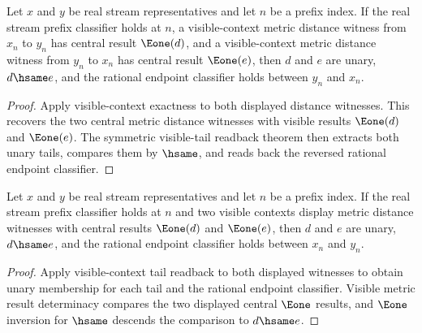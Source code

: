 \begin{theorem}
\label{thm:completion-visible-context-symmetric-tail-readback}
Let $x$ and $y$ be real stream representatives and let $n$ be a prefix
index. If the real stream prefix classifier holds at $n$, a visible-context
metric distance witness from $x_n$ to $y_n$ has central result $\Eone(d)$,
and a visible-context metric distance witness from $y_n$ to $x_n$ has central
result $\Eone(e)$, then $d$ and $e$ are unary, $d\hsame e$, and the rational
endpoint classifier holds between $y_n$ and $x_n$.
\end{theorem}
\begin{proof}
Apply visible-context exactness to both displayed distance witnesses. This
recovers the two central metric distance witnesses with visible results
$\Eone(d)$ and $\Eone(e)$. The symmetric visible-tail readback theorem then
extracts both unary tails, compares them by $\hsame$, and reads back the
reversed rational endpoint classifier.
\end{proof}

\begin{theorem}
\label{thm:completion-metric-distance-visible-context-e1-tail-deterministic}
Let $x$ and $y$ be real stream representatives and let $n$ be a prefix
index. If the real stream prefix classifier holds at $n$ and two visible
contexts display metric distance witnesses with central results $\Eone(d)$
and $\Eone(e)$, then $d$ and $e$ are unary, $d\hsame e$, and the rational
endpoint classifier holds between $x_n$ and $y_n$.
\end{theorem}
\begin{proof}
Apply visible-context tail readback to both displayed witnesses to obtain
unary membership for each tail and the rational endpoint classifier. Visible
metric result determinacy compares the two displayed central $\Eone$ results,
and $\Eone$ inversion for $\hsame$ descends the comparison to $d\hsame e$.
\end{proof}


